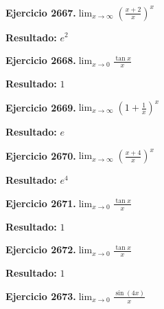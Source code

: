 \documentclass[10pt,a4paper]{article}
\begin{document}
\newpage
\begin{ejbox}
\textbf{Ejercicio 2667.}\quad $\lim_{x\to \infty} \left(\frac{x+2}{x}\right)^{x}$
\end{ejbox}

\begin{solbox}
\textbf{Resultado:} \(\displaystyle e^{2}\)
\end{solbox}

\begin{ejbox}
\textbf{Ejercicio 2668.}\quad $\lim_{x\to 0} \frac{\tan x}{x}$
\end{ejbox}

\begin{solbox}
\textbf{Resultado:} \(\displaystyle 1\)
\end{solbox}

\begin{ejbox}
\textbf{Ejercicio 2669.}\quad $\lim_{x\to \infty} \left(1+\frac{1}{x}\right)^x$
\end{ejbox}

\begin{solbox}
\textbf{Resultado:} \(\displaystyle e\)
\end{solbox}

\newpage
\begin{ejbox}
\textbf{Ejercicio 2670.}\quad $\lim_{x\to \infty} \left(\frac{x+4}{x}\right)^{x}$
\end{ejbox}

\begin{solbox}
\textbf{Resultado:} \(\displaystyle e^{4}\)
\end{solbox}

\begin{ejbox}
\textbf{Ejercicio 2671.}\quad $\lim_{x\to 0} \frac{\tan x}{x}$
\end{ejbox}

\begin{solbox}
\textbf{Resultado:} \(\displaystyle 1\)
\end{solbox}

\begin{ejbox}
\textbf{Ejercicio 2672.}\quad $\lim_{x\to 0} \frac{\tan x}{x}$
\end{ejbox}

\begin{solbox}
\textbf{Resultado:} \(\displaystyle 1\)
\end{solbox}

\newpage
\begin{ejbox}
\textbf{Ejercicio 2673.}\quad $\lim_{x\to 0} \frac{\sin(4x)}{x}$
\end{ejbox}
\end{document}
